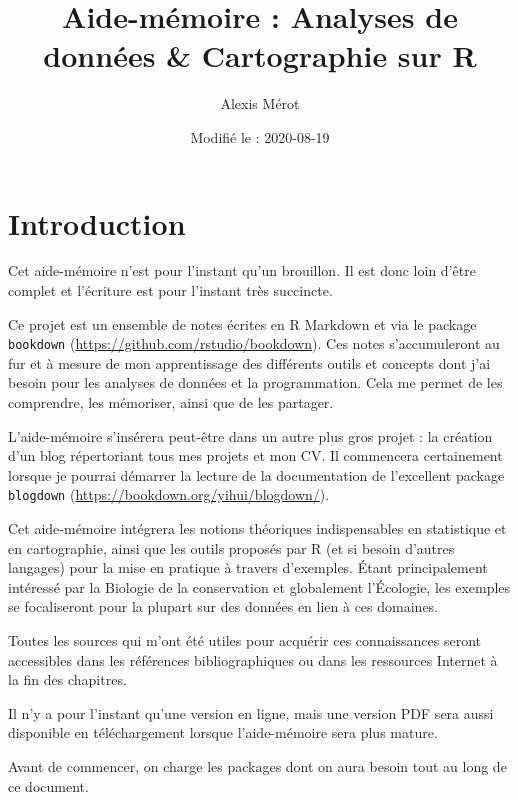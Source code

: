 \documentclass[
  french,
]{book}
\title{Aide-mémoire : Analyses de données \& Cartographie sur R}
\author{Alexis Mérot}
\date{Modifié le : 2020-08-19}
\newenvironment{infobox}[1]
  {
  \begin{itemize}
  \renewcommand{\labelitemi}{
    \raisebox{-.7\height}[0pt][0pt]{
      {\setkeys{Gin}{width=3em,keepaspectratio}
        \texttt{[image: images/\#1]}}
    }
  }
  \setlength{\fboxsep}{1em}
  \begin{blackbox}
  \item
  }
  {
  \end{blackbox}
  \end{itemize}
  }
\begin{document}
\maketitle

{
\setcounter{tocdepth}{1}
\tableofcontents
}
\hypertarget{introduction}{%
\chapter*{Introduction}\label{introduction}}

\begin{infobox}{caution}

Cet aide-mémoire n'est pour l'instant qu'un brouillon. Il est donc loin d'être complet et l'écriture est pour l'instant très succincte.

\end{infobox}

Ce projet est un ensemble de notes écrites en R Markdown \citep{R-rmarkdown} et via
le package \texttt{bookdown} (\url{https://github.com/rstudio/bookdown}). Ces notes
s'accumuleront au fur et à mesure de mon apprentissage des différents outils et
concepts dont j'ai besoin pour les analyses de données et la programmation. Cela
me permet de les comprendre, les mémoriser, ainsi que de les partager.

L'aide-mémoire s'insérera peut-être dans un autre plus gros projet : la création
d'un blog répertoriant tous mes projets et mon CV. Il commencera certainement
lorsque je pourrai démarrer la lecture de la documentation de l'excellent
package \texttt{blogdown} (\url{https://bookdown.org/yihui/blogdown/}).

Cet aide-mémoire intégrera les notions théoriques indispensables en statistique
et en cartographie, ainsi que les outils proposés par R (et si besoin d'autres
langages) pour la mise en pratique à travers d'exemples. Étant principalement
intéressé par la Biologie de la conservation et globalement l'Écologie, les
exemples se focaliseront pour la plupart sur des données en lien à ces domaines.

Toutes les sources qui m'ont été utiles pour acquérir ces connaissances seront
accessibles dans les références bibliographiques ou dans les ressources Internet
à la fin des chapitres.

Il n'y a pour l'instant qu'une version en ligne, mais une version PDF sera aussi disponible en téléchargement lorsque l'aide-mémoire sera plus mature.

Avant de commencer, on charge les packages dont on aura besoin tout au long de
ce document.
\end{document}
